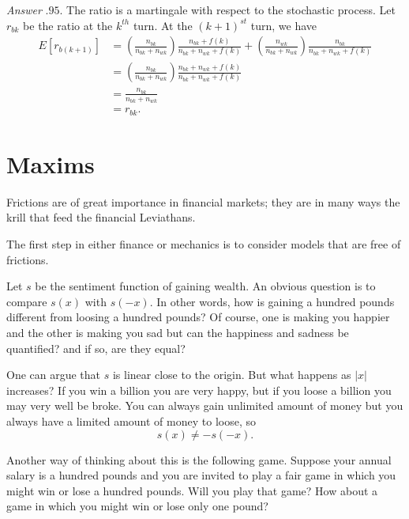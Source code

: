 \documentclass{amsart}
\theoremstyle{plain}
\numberwithin{equation}{section}
\begin{document}
\begin{enumerate}
\emph{Answer} $.95$. The ratio is a martingale with 
respect to the stochastic process.
Let $r_{bk}$ be the ratio at the $k^{th}$ 
turn. At the $(k+1)^{st}$ turn, we have 
\begin{align}
E[ r_{b(k+1)} ] &= 
\left( \frac{n_{bk}}{n_{bk} + n_{wk}} \right)
\frac{n_{bk} + f(k)}{n_{bk} + n_{wk} + f(k)} +
\left( \frac{n_{wk}}{n_{bk} + n_{wk}} \right)
\frac{n_{bk}}{n_{bk} + n_{wk} + f(k)}\\
&= \left( \frac{n_{bk}}{n_{bk} + n_{wk}} \right)
\frac{n_{bk} + n_{wk} + f(k) }{n_{bk} + n_{wk} + f(k)}\\
&= \frac{n_{bk}}{n_{bk} + n_{wk}}\\
&= r_{bk}.
\end{align}


\end{enumerate}


\section*{Maxims}
Frictions are of great importance in financial markets;
they are in many ways the krill that feed the financial 
Leviathans.

The first step in either finance or mechanics is to 
consider models that are free of frictions. 

Let $s$ be the sentiment function of 
gaining wealth. An obvious question is
to compare $s(x)$ with $s(-x)$. In other words,
how is gaining a hundred pounds different from 
loosing a hundred pounds? Of course, one is making 
you happier and the other is making you sad but 
can the happiness and sadness be quantified? and 
if so, are they equal?

One can argue that $s$ is linear close to the 
origin. But what happens as $|x|$ increases?
If you win a billion you are very happy, but if you 
loose a billion you may very well be broke. You can 
always gain unlimited amount of money but you always 
have a limited amount of money to loose, so 
\begin{equation}
s(x) \neq -s(-x).
\end{equation}

Another way of thinking about this is the following 
game. Suppose your annual salary is a hundred pounds
and you are invited to play a fair game in which you 
might win or lose a hundred pounds. Will you play that 
game? How about a game in which you might win or lose 
only one pound?
\end{document}
